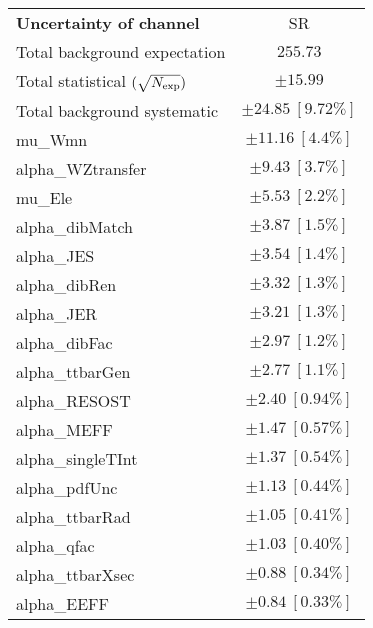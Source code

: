 
\begin{table}
\begin{center}
\setlength{\tabcolsep}{0.0pc}
\begin{tabular*}{\textwidth}{@{\extracolsep{\fill}}lc}
\noalign{\smallskip}\hline\noalign{\smallskip}
{\bf Uncertainty of channel}                                    & SR            \\
\noalign{\smallskip}\hline\noalign{\smallskip}
Total background expectation             &  $255.73$       \\
\noalign{\smallskip}\hline\noalign{\smallskip}
Total statistical $(\sqrt{N_{\rm exp}})$              & $\pm 15.99$       \\
Total background systematic               & $\pm 24.85\ [9.72\%] $             \\
\noalign{\smallskip}\hline\noalign{\smallskip}
\noalign{\smallskip}\hline\noalign{\smallskip}
mu\_Wmn         & $\pm 11.16\ [4.4\%] $       \\
alpha\_WZtransfer         & $\pm 9.43\ [3.7\%] $       \\
mu\_Ele         & $\pm 5.53\ [2.2\%] $       \\
alpha\_dibMatch         & $\pm 3.87\ [1.5\%] $       \\
alpha\_JES         & $\pm 3.54\ [1.4\%] $       \\
alpha\_dibRen         & $\pm 3.32\ [1.3\%] $       \\
alpha\_JER         & $\pm 3.21\ [1.3\%] $       \\
alpha\_dibFac         & $\pm 2.97\ [1.2\%] $       \\
alpha\_ttbarGen         & $\pm 2.77\ [1.1\%] $       \\
alpha\_RESOST         & $\pm 2.40\ [0.94\%] $       \\
alpha\_MEFF         & $\pm 1.47\ [0.57\%] $       \\
alpha\_singleTInt         & $\pm 1.37\ [0.54\%] $       \\
alpha\_pdfUnc         & $\pm 1.13\ [0.44\%] $       \\
alpha\_ttbarRad         & $\pm 1.05\ [0.41\%] $       \\
alpha\_qfac         & $\pm 1.03\ [0.40\%] $       \\
alpha\_ttbarXsec         & $\pm 0.88\ [0.34\%] $       \\
alpha\_EEFF         & $\pm 0.84\ [0.33\%] $       \\

\end{tabular*}
\end{center}
\end{table}
